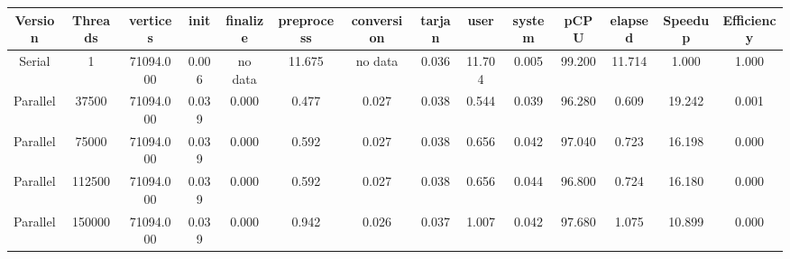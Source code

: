 \begin{tabular}{|c|c|c|c|c|c|c|c|c|c|c|c|c|c|}
\toprule
 Version &  Threads &   vertices &  init & finalize &  preprocess & conversion &  tarjan &   user &  system &   pCPU &  elapsed &  Speedup &  Efficiency \\
\midrule
  Serial &        1 &  71094.000 & 0.006 &  no data &      11.675 &    no data &   0.036 & 11.704 &   0.005 & 99.200 &   11.714 &    1.000 &       1.000 \\
Parallel &    37500 &  71094.000 & 0.039 &    0.000 &       0.477 &      0.027 &   0.038 &  0.544 &   0.039 & 96.280 &    0.609 &   19.242 &       0.001 \\
Parallel &    75000 &  71094.000 & 0.039 &    0.000 &       0.592 &      0.027 &   0.038 &  0.656 &   0.042 & 97.040 &    0.723 &   16.198 &       0.000 \\
Parallel &   112500 &  71094.000 & 0.039 &    0.000 &       0.592 &      0.027 &   0.038 &  0.656 &   0.044 & 96.800 &    0.724 &   16.180 &       0.000 \\
Parallel &   150000 &  71094.000 & 0.039 &    0.000 &       0.942 &      0.026 &   0.037 &  1.007 &   0.042 & 97.680 &    1.075 &   10.899 &       0.000 \\
\bottomrule
\end{tabular}
